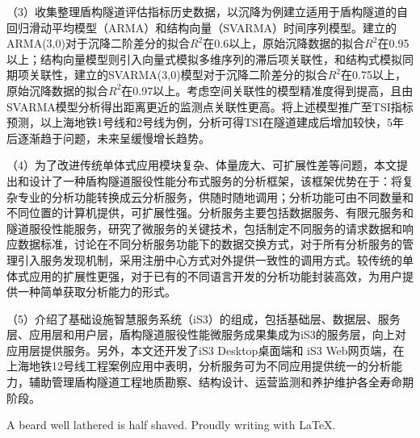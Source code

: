 \begin{cabstract}
（3）收集整理盾构隧道评估指标历史数据，以沉降为例建立适用于盾构隧道的自回归滑动平均模型（ARMA）和结构向量（SVARMA）时间序列模型。建立的ARMA(3,0)对于沉降二阶差分的拟合$R^2$在0.6以上，原始沉降数据的拟合$R^2$在0.95以上；结构向量模型则引入向量式模拟多维序列的滞后项关联性，和结构式模拟同期项关联性，建立的SVARMA(3,0)模型对于沉降二阶差分的拟合$R^2$在0.75以上，原始沉降数据的拟合$R^2$在0.97以上。考虑空间关联性的模型精准度得到提高，且由SVARMA模型分析得出距离更近的监测点关联性更高。将上述模型推广至TSI指标预测，以上海地铁1号线和2号线为例，分析可得TSI在隧道建成后增加较快，5年后逐渐趋于问题，未来呈缓慢增长趋势。

（4）为了改进传统单体式应用模块复杂、体量庞大、可扩展性差等问题，本文提出和设计了一种盾构隧道服役性能分布式服务的分析框架，该框架优势在于：将复杂专业的分析功能转换成云分析服务，供随时随地调用；分析功能可由不同数量和不同位置的计算机提供，可扩展性强。分析服务主要包括数据服务、有限元服务和隧道服役性能服务，研究了微服务的关键技术，包括制定不同服务的请求数据和响应数据标准，讨论在不同分析服务功能下的数据交换方式，对于所有分析服务的管理引入服务发现机制，采用注册中心方式对外提供一致性的调用方式。较传统的单体式应用的扩展性更强，对于已有的不同语言开发的分析功能封装高效，为用户提供一种简单获取分析能力的形式。

（5）介绍了基础设施智慧服务系统（iS3）的组成，包括基础层、数据层、服务层、应用层和用户层，盾构隧道服役性能微服务成果集成为iS3的服务层，向上对应用层提供服务。另外，本文还开发了iS3 Desktop桌面端和 iS3 Web网页端，在上海地铁12号线工程案例应用中表明，分析服务可为不同应用提供统一的分析能力，辅助管理盾构隧道工程地质勘察、结构设计、运营监测和养护维护各全寿命期阶段。

\end{cabstract}



\begin{eabstract}

A beard well lathered is half shaved. Proudly writing with \LaTeX{}.

\end{eabstract}

